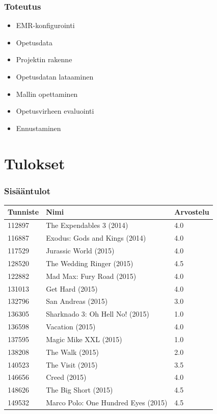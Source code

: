 \documentclass{beamer}
\begin{document}
\begin{frame}
\frametitle{Toteutus}

\begin{itemize}
	\item EMR-konfigurointi
	\item Opetusdata
	\item Projektin rakenne
	\item Opetusdatan lataaminen
	\item Mallin opettaminen
	\item Opetusvirheen evaluointi
	\item Ennustaminen
\end{itemize}

\end{frame}


\section{Tulokset}

\begin{frame}
\frametitle{Sisääntulot}

\begin{tabular}{lll}
	Tunniste & Nimi & Arvostelu \\ \hline
	112897 & The Expendables 3 (2014) & 4.0 \\
	116887 & Exodus: Gods and Kings (2014) & 4.0 \\
	117529 & Jurassic World (2015) & 4.0 \\
	128520 & The Wedding Ringer (2015) & 4.5 \\
	122882 & Mad Max: Fury Road (2015) & 4.0 \\
	131013 & Get Hard (2015) & 4.0 \\
	132796 & San Andreas (2015) & 3.0 \\
	136305 & Sharknado 3: Oh Hell No! (2015) & 1.0 \\
	136598 & Vacation (2015) & 4.0 \\
	137595 & Magic Mike XXL (2015) & 1.0 \\
	138208 & The Walk (2015) & 2.0 \\
	140523 & The Visit (2015) & 3.5 \\
	146656 & Creed (2015) & 4.0 \\
	148626 & The Big Short (2015) & 4.5 \\
	149532 & Marco Polo: One Hundred Eyes (2015) & 4.5 \\
\end{tabular}

\end{frame}
\end{document}
